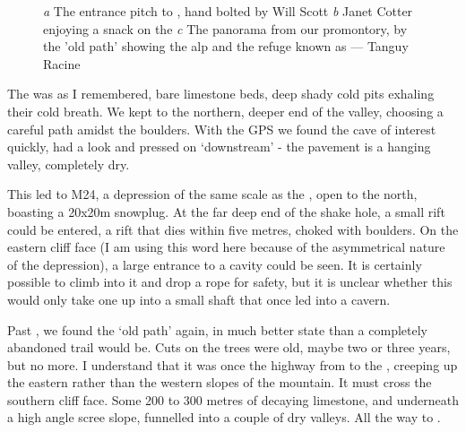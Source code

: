 \begin{figure}[t!]
\checkoddpage \ifoddpage \forcerectofloat \else \forceversofloat \fi
    \centering
    \begin{subfigure}[t]{0.59\textwidth}
        \centering
        \caption{} \label{Will Scott bolting}
    \end{subfigure}
    \hfill
    \begin{subfigure}[t]{0.393\textwidth}
        \centering
        \caption{} \label{Ice}
    \end{subfigure}

    \vspace{0.3cm}
    \begin{subfigure}[t]{\textwidth}
    \centering
        \caption{} \label{Panorama}
    \end{subfigure}
    \caption{
    \emph{a} The entrance pitch to \protect{}, hand bolted by Will Scott
    \emph{b} Janet Cotter enjoying a snack on the \protect{}
    \emph{c} The panorama from our promontory, by the 'old \protect{} path' showing the \protect{} alp and the refuge known as \emph{} --- Tanguy Racine }
\end{figure}


The  was as I remembered, bare limestone beds, deep shady cold pits exhaling their cold breath. We kept to the northern, deeper end of the valley, choosing a careful path amidst the boulders. With the GPS we found the cave of interest quickly, had a look and pressed on ‘downstream’ - the pavement is a hanging valley, completely dry. 

This led to M24, a depression of the same scale as the , open to the north, boasting a 20x20m snowplug. At the far deep end of the shake hole, a small rift could be entered, a rift that dies within five metres, choked with boulders. On the eastern cliff face  (I am using this word here because of the asymmetrical nature of the depression), a large entrance to a cavity could be seen. It is certainly possible to climb into it and drop a rope for safety, but it is unclear whether this would only take one up into a small shaft that once led into a cavern. 

Past , we found the ‘old  path’ again, in much better state than a completely abandoned trail would be. Cuts on the trees were old, maybe two or three years, but no more. I understand that it was once the highway from  to the , creeping up the eastern rather than the western slopes of the mountain. It must cross the  southern cliff face. Some 200 to 300 metres of decaying limestone, and underneath a high angle scree slope, funnelled into a couple of dry valleys. All the way to . 

